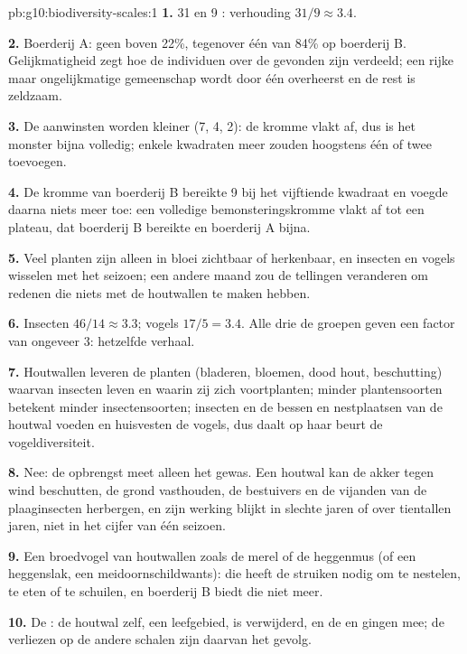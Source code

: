 \begin{solution}{pb:g10:biodiversity-scales:1}
\textbf{1.} 31 en 9 : verhouding $31/9 \approx 3.4$.

\textbf{2.} Boerderij A: geen  boven 22\%, tegenover één van 84\% op
boerderij B. Gelijkmatigheid zegt hoe de individuen over de gevonden
 zijn verdeeld; een rijke maar ongelijkmatige gemeenschap wordt
door één  overheerst en de rest is zeldzaam.

\textbf{3.} De aanwinsten worden kleiner (7, 4, 2): de kromme vlakt af,
dus is het monster bijna volledig; enkele kwadraten meer zouden hoogstens
één of twee  toevoegen.

\textbf{4.} De kromme van boerderij B bereikte 9 bij het vijftiende
kwadraat en voegde daarna niets meer toe: een volledige
bemonsteringskromme vlakt af tot een plateau, dat boerderij B bereikte
en boerderij A bijna.

\textbf{5.} Veel planten zijn alleen in bloei zichtbaar of herkenbaar, en
insecten en vogels wisselen met het seizoen; een andere maand zou de
tellingen veranderen om redenen die niets met de houtwallen te maken
hebben.

\textbf{6.} Insecten $46/14 \approx 3.3$; vogels $17/5 = 3.4$. Alle drie
de groepen geven een factor van ongeveer 3: hetzelfde verhaal.

\textbf{7.} Houtwallen leveren de planten (bladeren, bloemen, dood hout,
beschutting) waarvan insecten leven en waarin zij zich voortplanten;
minder plantensoorten betekent minder insectensoorten; insecten en de
bessen en nestplaatsen van de houtwal voeden en huisvesten de vogels, dus
daalt op haar beurt de vogeldiversiteit.

\textbf{8.} Nee: de opbrengst meet alleen het gewas. Een houtwal kan de
akker tegen wind beschutten, de grond vasthouden, de bestuivers en de
vijanden van de plaaginsecten herbergen, en zijn werking blijkt in slechte
jaren of over tientallen jaren, niet in het cijfer van één seizoen.

\textbf{9.} Een broedvogel van houtwallen zoals de merel of de heggenmus
(of een heggenslak, een meidoornschildwants): die heeft de struiken nodig
om te nestelen, te eten of te schuilen, en boerderij B biedt die niet
meer.

\textbf{10.} De : de houtwal zelf, een leefgebied, is
verwijderd, en de  en  gingen mee; de verliezen op de andere
schalen zijn daarvan het gevolg.


\end{solution}
